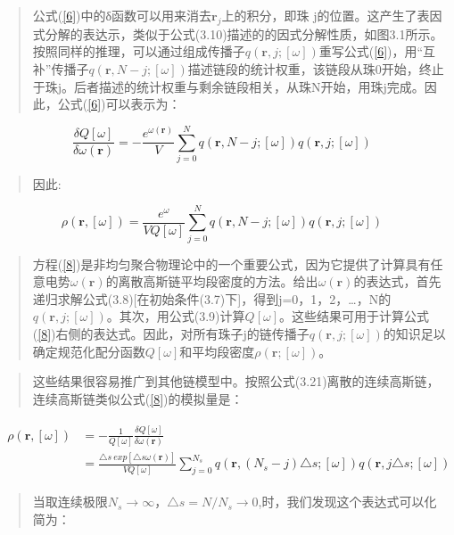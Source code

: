 \begin{quotation}
公式(\ref{6})中的δ函数可以用来消去$\mathbf{r}_{j}$上的积分，即珠 j的位置。这产生了表因式分解的表达示，类似于公式(3.10)描述的的因式分解性质，如图3.1所示。按照同样的推理，可以通过组成传播子$q(\mathbf{r},j;[\omega])$重写公式(\ref{6})，用“互补”传播子$q(\mathbf{r},N-j;[\omega])$描述链段的统计权重，该链段从珠0开始，终止于珠j。后者描述的统计权重与剩余链段相关，从珠N开始，用珠j完成。因此，公式(\ref{6})可以表示为：
\end{quotation}
\begin{equation}\label{7}
\frac{\delta Q[\omega]}{\delta \omega(\mathbf{\mathbf{\mathbf{r}}})}=-\frac{e^{\omega(\mathbf{r})}}{V}\sum_{j=0}^{N}q(\mathbf{r},N-j;[\omega])q(\mathbf{r},j;[\omega])
\end{equation}
\begin{quotation}
因此:	
\end{quotation}
\begin{equation}\label{8}
\rho(\mathbf{r},[\omega])=\frac{e^{\omega}}{VQ[\omega]}\sum_{j=0}^{N}q(\mathbf{r},N-j;[\omega])q(\mathbf{r},j;[\omega])
\end{equation}
\begin{quotation}
方程(\ref{8})是非均匀聚合物理论中的一个重要公式，因为它提供了计算具有任意电势$\omega(\mathbf{r})$的离散高斯链平均段密度的方法。给出$\omega(\mathbf{r})$的表达式，首先递归求解公式(3.8)[在初始条件(3.7)下]，得到j=0，1，2，…，N的$q(\mathbf{r},j;[\omega])$。其次，用公式(3.9)计算$Q[\omega]$。这些结果可用于计算公式(\ref{8})右侧的表达式。因此，对所有珠子j的链传播子$q(\mathbf{r},j;[\omega])$的知识足以确定规范化配分函数$Q[\omega]$和平均段密度$\rho(\mathbf{r};[\omega])$。
\end{quotation}
\begin{quotation}
这些结果很容易推广到其他链模型中。按照公式(3.21)离散的连续高斯链，连续高斯链类似公式(\ref{8})的模拟量是：
\end{quotation}
\begin{align}\label{9}
\begin{split}
\rho(\mathbf{r},[\omega])&=-\frac{1}{Q[\omega]}\frac{\delta Q[\omega]}{\delta \omega(\mathbf{r})}\\ &=\frac{\triangle s ~exp[\triangle s\omega(\mathbf{r})]}{VQ[\omega]}\sum_{j=0}^{N_s}q(\mathbf{r},(N_s-j)\triangle s;[\omega])q(\mathbf{r},j\triangle s;[\omega])
\end{split}
\end{align}
\begin{quotation}
当取连续极限$N_s\to \infty$，$\triangle s=N/N_s\to 0$,时，我们发现这个表达式可以化简为：
\end{quotation}
